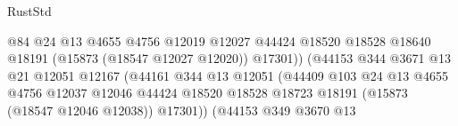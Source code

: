 \begin{lexlean}{RustStd}
\begin{coremodule}
                                                    @84
                                                    @24
                                                    @13
                                                    @4655
                                                    @4756
                                                    @12019
                                                    @12027
                                                    @44424
                                                    @18520
                                                    @18528
                                                    @18640
                                                    @18191
                                                    (@15873 (@18547 @12027 @12020))
                                                    @17301))
                                                (@44153
                                                  @344
                                                  @3671
                                                  @13
                                                  @21
                                                  @12051
                                                  @12167
                                                  (@44161
                                                    @344
                                                    @13
                                                    @12051
                                                    (@44409
                                                      @103
                                                      @24
                                                      @13
                                                      @4655
                                                      @4756
                                                      @12037
                                                      @12046
                                                      @44424
                                                      @18520
                                                      @18528
                                                      @18723
                                                      @18191
                                                      (@15873 (@18547 @12046 @12038))
                                                      @17301))
                                                  (@44153
                                                    @349
                                                    @3670
                                                    @13

\end{coremodule}
\end{lexlean}
